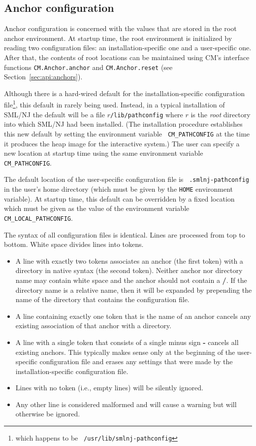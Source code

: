 \subsection{Anchor configuration}
\label{sec:anchor:config}

Anchor configuration is concerned with the values that are stored in
the root anchor environment.  At startup time, the root environment is
initialized by reading two configuration files: an
installation-specific one and a user-specific one.  After that, the
contents of root locations can be maintained using CM's interface
functions {\tt CM.Anchor.anchor} and {\tt CM.Anchor.reset} (see
Section~\ref{sec:api:anchors}).

Although there is a hard-wired default for the installation-specific
configuration file\footnote{which happens to be {\tt
/usr/lib/smlnj-pathconfig}}, this default in rarely being used.
Instead, in a typical installation of SML/NJ the default will be a
file $r${\tt /lib/pathconfig} where $r$ is the {\it root} directory
into which SML/NJ had been installed.  (The installation procedure
establishes this new default by setting the environment variable {\tt
CM\_PATHCONFIG} at the time it produces the heap image for
the interactive system.)  The user can specify a new location at
startup time using the same environment variable {\tt CM\_PATHCONFIG}.

The default location of the user-specific configuration file is {\tt
.smlnj-pathconfig} in the user's home directory (which must be given
by the {\tt HOME} environment variable).  At startup time, this
default can be overridden by a fixed location which must be given as
the value of the environment variable {\tt CM\_LOCAL\_PATHCONFIG}.

The syntax of all configuration files is identical.  Lines are
processed from top to bottom. White space divides lines into tokens.
\begin{itemize}
\item A line with exactly two tokens associates an anchor (the first
token) with a directory in native syntax (the second token).  Neither
anchor nor directory name may contain white space and the anchor
should not contain a {\bf /}.  If the directory name is a relative
name, then it will be expanded by prepending the name of the directory
that contains the configuration file.
\item A line containing exactly one token that is the name of an
anchor cancels any existing association of that anchor with a
directory.
\item A line with a single token that consists of a single minus sign
{\bf -} cancels all existing anchors.  This typically makes sense only
at the beginning of the user-specific configuration file and
erases any settings that were made by the installation-specific
configuration file.
\item Lines with no token (i.e., empty lines) will be silently ignored.
\item Any other line is considered malformed and will cause a warning
but will otherwise be ignored.
\end{itemize}

